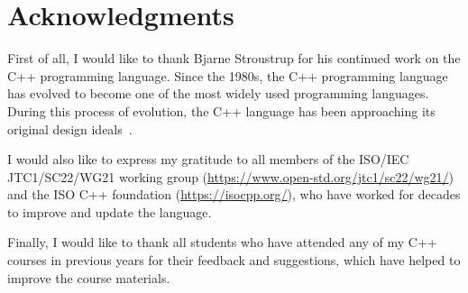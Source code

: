 \chapter*{Acknowledgments}

First of all, I would like to thank Bjarne Stroustrup for his continued work on the C++ programming language. Since the 1980s, the C++ programming language has evolved to become one of the most widely used programming languages. During this process of evolution, the C++ language has been approaching its original design ideals~\cite{stroustrup:1994}.

I would also like to express my gratitude to all members of the ISO/IEC JTC1/SC22/WG21 working group (\url{https://www.open-std.org/jtc1/sc22/wg21/}) and the ISO C++ foundation (\url{https://isocpp.org/}), who have worked for decades to improve and update the language.

Finally, I would like to thank all students who have attended any of my C++ courses in previous years for their feedback and suggestions, which have helped to improve the course materials.